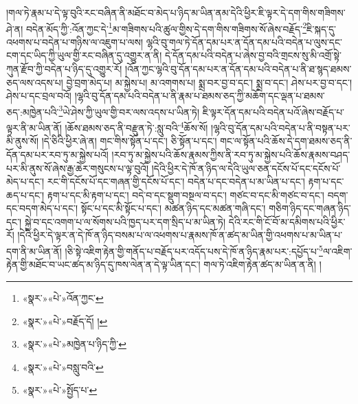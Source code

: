 །གལ་ཏེ་རྣམ་པ་དེ་ལྟ་བུའི་རང་བཞིན་ནི་མཐོང་བ་མེད་པ་ཉིད་མ་ཡིན་ནམ་དེའི་ཕྱིར་ཇི་ལྟར་དེ་དག་གིས་གཟིགས་ཤེ་ན། བདེན་མོད་ཀྱི་:འོན་ཀྱང་དེ་\footnote{«སྣར་»«པེ་»འོན་ཀྱང་}མ་གཟིགས་པའི་ཚུལ་གྱིས་དེ་དག་གིས་གཟིགས་སོ་ཞེས་བརྗོད་\footnote{«སྣར་»«པེ་»བརྗོད་དོ། །}ཇི་སྐད་དུ་འཕགས་པ་བདེན་པ་གཉིས་ལ་འཇུག་པ་ལས། ལྷའི་བུ་གལ་ཏེ་དོན་དམ་པར་ན་དོན་དམ་པའི་བདེན་པ་ལུས་དང་ངག་དང་ཡིད་ཀྱི་ཡུལ་གྱི་རང་བཞིན་དུ་འགྱུར་ན་ནི། དེ་དོན་དམ་པའི་བདེན་པ་ཞེས་བྱ་བའི་གྲངས་སུ་མི་འགྲོ་སྟེ་ཀུན་རྫོབ་ཀྱི་བདེན་པ་ཉིད་དུ་འགྱུར་རོ། །འོན་ཀྱང་ལྷའི་བུ་དོན་དམ་པར་ན་དོན་དམ་པའི་བདེན་པ་ནི་ཐ་སྙད་ཐམས་ཅད་ལས་འདས་པ། བྱེ་བྲག་མེད་པ། མ་སྐྱེས་པ། མ་འགགས་པ། སྨྲ་བར་བྱ་བ་དང་། སྨྲ་བ་དང་། ཤེས་པར་བྱ་བ་དང་། ཤེས་པ་དང་བྲལ་བའོ། །ལྷའི་བུ་དོན་དམ་པའི་བདེན་པ་ནི་རྣམ་པ་ཐམས་ཅད་ཀྱི་མཆོག་དང་ལྡན་པ་ཐམས་ཅད་:མཁྱེན་པའི་\footnote{«སྣར་»«པེ་»མཁྱེན་པ་ཉིད་ཀྱི་}ཡེ་ཤེས་ཀྱི་ཡུལ་གྱི་བར་ལས་འདས་པ་ཡིན་ཏེ། ཇི་ལྟར་དོན་དམ་པའི་བདེན་པའོ་ཞེས་བརྗོད་པ་ལྟར་ནི་མ་ཡིན་ནོ། །ཆོས་ཐམས་ཅད་ནི་བརྫུན་ཏེ་:སླུ་བའི་\footnote{«སྣར་»«པེ་»བསླུ་བའི་}ཆོས་སོ། །ལྷའི་བུ་དོན་དམ་པའི་བདེན་པ་ནི་བསྟན་པར་མི་ནུས་སོ། །དེ་ཅིའི་ཕྱིར་ཞེ་ན། གང་གིས་སྟོན་པ་དང་། ཅི་སྟོན་པ་དང་། གང་ལ་སྟོན་པའི་ཆོས་དེ་དག་ཐམས་ཅད་ནི་དོན་དམ་པར་རབ་ཏུ་མ་སྐྱེས་པའོ། །རབ་ཏུ་མ་སྐྱེས་པའི་ཆོས་རྣམས་ཀྱིས་ནི་རབ་ཏུ་མ་སྐྱེས་པའི་ཆོས་རྣམས་བཤད་པར་མི་ནུས་སོ་ཞེས་རྒྱ་ཆེར་གསུངས་པ་ལྟ་བུའོ། །དེའི་ཕྱིར་དེ་ཁོ་ན་ཉིད་ལ་དེའི་ཡུལ་ཅན་དངོས་པོ་དང་དངོས་པོ་མེད་པ་དང་། རང་གི་དངོས་པོ་དང་གཞན་གྱི་དངོས་པོ་དང་། བདེན་པ་དང་བདེན་པ་མ་ཡིན་པ་དང་། རྟག་པ་དང་ཆད་པ་དང་། རྟག་པ་དང་མི་རྟག་པ་དང་། བདེ་བ་དང་སྡུག་བསྔལ་བ་དང་། གཙང་བ་དང་མི་གཙང་བ་དང་། བདག་དང་བདག་མེད་པ་དང་། སྟོང་པ་དང་མི་སྟོང་པ་དང་། མཚན་ཉིད་དང་མཚན་གཞི་དང་། གཅིག་ཉིད་དང་གཞན་ཉིད་དང་། སྐྱེ་བ་དང་འགག་པ་ལ་སོགས་པའི་ཁྱད་པར་དག་སྲིད་པ་མ་ཡིན་ཏེ། དེའི་རང་གི་ངོ་བོ་མ་དམིགས་པའི་ཕྱིར་རོ། །དེའི་ཕྱིར་དེ་ལྟར་ན་དེ་ཁོ་ན་ཉིད་བསམ་པ་ལ་འཕགས་པ་རྣམས་ཁོ་ན་ཚད་མ་ཡིན་གྱི་འཕགས་པ་མ་ཡིན་པ་དག་ནི་མ་ཡིན་ནོ། །ཅི་སྟེ་འཇིག་རྟེན་གྱི་གནོད་པ་བརྗོད་པར་འདོད་པས་དེ་ཁོ་ན་ཉིད་རྣམ་པར་:དཔྱོད་པ་\footnote{«སྣར་»«པེ་»སྤྱོད་པ་}ལ་འཇིག་རྟེན་གྱི་མཐོང་བ་ཡང་ཚད་མ་ཉིད་དུ་ཁས་ལེན་ན་དེ་ལྟ་ཡིན་དང་། གལ་ཏེ་འཇིག་རྟེན་ཚད་མ་ཡིན་ན་ནི། །
